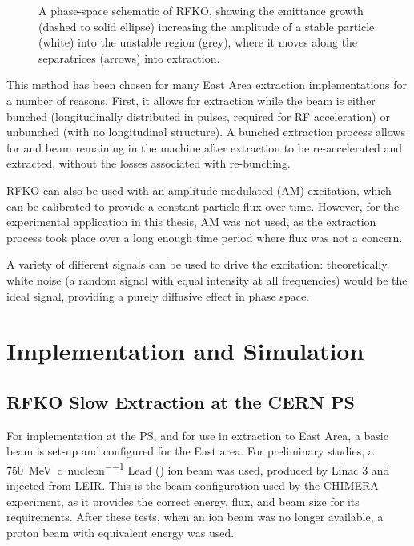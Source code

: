 \documentclass[11pt]{report}
\begin{document}
\begin{figure}
  \caption{A phase-space schematic of RFKO, showing the emittance growth (dashed to solid ellipse) increasing the amplitude of a stable particle (white) into the unstable region (grey), where it moves along the separatrices (arrows) into extraction.}\label{fig:rfko_phase_space}
\end{figure}

This method has been chosen for many East Area extraction implementations for a number of reasons. First, it allows for extraction while the beam is either bunched (longitudinally distributed in pulses, required for RF acceleration) or unbunched (with no longitudinal structure). A bunched extraction process allows for and beam remaining in the machine after extraction to be re-accelerated and extracted, without the losses associated with re-bunching.

RFKO can also be used with an amplitude modulated (AM) excitation, which can be calibrated to provide a constant particle flux over time. However, for the experimental application in this thesis, AM was not used, as the extraction process took place over a long enough time period where flux was not a concern.

A variety of different signals can be used to drive the excitation: theoretically, white noise (a random signal with equal intensity at all frequencies) would be the ideal signal, providing a purely diffusive effect in phase space. 

\chapter{Implementation and Simulation}

\section{RFKO Slow Extraction at the CERN PS}

For implementation at the PS, and for use in extraction to East Area, a basic beam is set-up and configured for the East area. For preliminary studies, a \qty[per-mode=symbol]{750}{\mega\electronvolt\per~c\per nucleon} Lead () ion beam was used, produced by Linac 3 and injected from LEIR. This is the beam configuration used by the CHIMERA experiment, as it provides the correct energy, flux, and beam size for its requirements. After these tests, when an ion beam was no longer available, a proton beam with equivalent energy was used.
\end{document}
